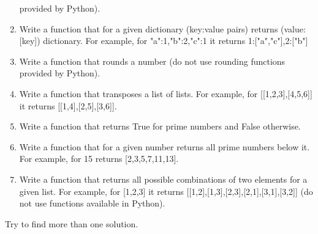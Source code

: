 \begin{enumerate}
provided by Python). 
\item Write a function that for a given dictionary (key:value pairs)
returns (value:[key]) dictionary. For example, for {"a":1,"b":2,"c":1}
it returns {1:["a","c"],2:["b"]}
\item Write a function that rounds a number (do not use rounding functions
provided by Python).
\item Write a function that transposes a list of lists. For example,
for [[1,2,3],[4,5,6]] it returns [[1,4],[2,5],[3,6]].
\item Write a function that returns True for prime numbers and
False otherwise.
\item Write a function that for a given number 
returns all prime numbers below it. For example, for 15 returns
[2,3,5,7,11,13].
\item Write a function that returns all possible combinations
of two elements for a given list. For example, for [1,2,3] it
returns [[1,2],[1,3],[2,3],[2,1],[3,1],[3,2]] (do not use
functions available in Python).
\end{enumerate}

Try to find more than one solution. 








